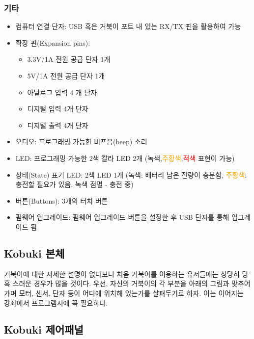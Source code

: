 \subsubsection{기타}

\begin{itemize}[leftmargin=*]
\item 컴퓨터 연결 단자: USB 혹은 거북이 포트 내 있는 RX/TX 핀을 활용하여 가능
\item 확장 핀(Expansion pins): 
  \begin{itemize}
  \item 3.3V/1A 전원 공급 단자 1개
  \item 5V/1A  전원 공급 단자 1개
  \item 아날로그 입력 4 개 단자
  \item 디지털 입력 4개 단자
  \item 디지털 출력 4개 단자
  \end{itemize}
\item 오디오: 프로그래밍 가능한 비프음(beep) 소리
\item LED: 프로그래밍 가능한 2색 칼라 LED 2개 ({\color{limegreen}녹색},\textcolor{orange}{주황색},\textcolor{red}{적색} 표현이 가능)
\item 상태(State) 표기 LED: 2색 LED 1개 ({\color{limegreen}녹색}: 배터리 남은 잔량이 충분함, \textcolor{orange}{주황색}: 충전할 필요가 있음, {\color{limegreen}녹색 점멸} - 충전 중)
\item 버튼(Buttons): 3개의 터치 버튼
\item 펌웨어 업그레이드: 펌웨어 업그레이드 버튼을 설정한 후 USB 단자를 통해 업그레이드 됨 
\end{itemize}

\subsection{Kobuki 본체}

거북이에 대한 자세한 설명이 없다보니 처음 거북이를 이용하는 유저들에는 상당히 당혹 스러운 경우가 많을 것이다. 우선, 자신의 거북이의 각 부분을 아래의 그림과 맞추어 가며 모터, 센서, 단자 등이 어디에 위치해 있는가를 살펴두기로 하자. 이는 이어지는 강좌에서 프로그램시에 꼭 필요하다. 

\subsection{Kobuki 제어패널}

